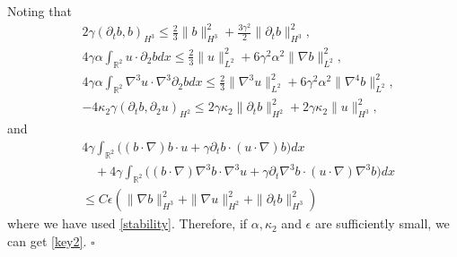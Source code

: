 \documentclass[reqno,11pt]{amsart}
\def\R{\mathbb R}
\numberwithin{Thm}{section}
\begin{document}
Noting that
\begin{align*}
&2\gamma(\partial_tb,b)_{H^3}
\leq \frac{2}{3}\|b\|_{H^3}^2+\frac{3\gamma^2}{2}\|\partial_t b\|_{H^3}^2,\\
&4\gamma\alpha\int_{\R^2}u\cdot\partial_2bdx
\leq \frac{2}{3}\|u\|_{L^2}^2+6\gamma^2\alpha^2\|\nabla b\|_{L^2}^2,\\
&4\gamma\alpha\int_{\R^2}\nabla^3u\cdot\nabla^3\partial_2bdx
\leq \frac{2}{3}\|\nabla^3u\|_{L^2}^2+6\gamma^2\alpha^2\|\nabla^4 b\|_{L^2}^2,\\
&-4\kappa_2\gamma(\partial_tb,\partial_2u)_{H^2}\leq 2\gamma\kappa_2\|\partial_tb\|_{H^2}^2+2\gamma\kappa_2\|u\|_{H^3}^2,
\end{align*}
and
 \begin{align*}
&4\gamma\int_{\R^2}\big((b\cdot\nabla) b\cdot u+\gamma\partial_{t}b\cdot (u\cdot\nabla) b\big)dx\nonumber\\&\quad+4\gamma\int_{\R^2}\big((b\cdot\nabla)\nabla^3 b\cdot\nabla^3 u+\gamma\partial_{t}\nabla^3b\cdot (u\cdot\nabla)\nabla^3 b\big)dx\nonumber\\
&\leq C\epsilon(\|\nabla b\|_{H^3}^2+\|\nabla u\|_{H^2}^2+\|\partial_t b\|_{H^3}^2)
\end{align*}
where we have used \eqref{stability}.
 Therefore, if $\alpha,\kappa_2$ and $\epsilon$ are sufficiently small, we can get \eqref{key2}. \hfill$\square$
\end{document}
